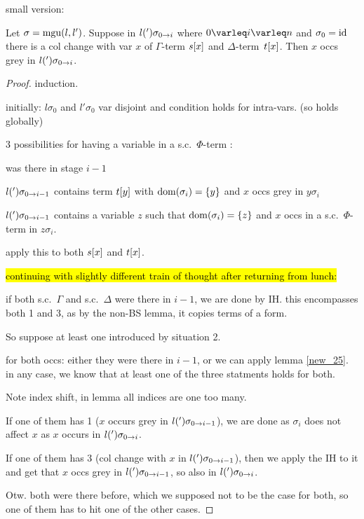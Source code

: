 \documentclass[,%
	paper=a4,%
	DIV11, %
	twoside=false,%
	liststotoc,
	bibtotoc,
	draft=false,%
	numbers=noendperiod
]{scrartcl}
\begin{document}
{\tiny

	small version: 

\begin{lemma}
	Let $\sigma = \operatorname{mgu}(l, l')$.
	Suppose in $l(')\sigma_{0 \rightarrow i}$ where $0\varleq i \varleq n$ and $\sigma_0 = \operatorname{id}$ there is a col change with var $x$ of $\Gamma$-term $s[x]$ and $\Delta$-term~$t[x]$.
	Then $x$ occs grey in $l(')\sigma_{0 \rightarrow i}$.
\end{lemma}
\begin{proof}
	induction.

	initially: $l\sigma_0$ and $l'\sigma_0$ var disjoint and condition holds for intra-vars. (so holds globally)

	3 possibilities for having a variable in a s.c.\ $\Phi$-term :
	\begin{compactenum}
	\item was there in stage $i-1$
	\item $l(')\sigma_{0 \rightarrow i-1}$ contains term $t[y]$ with $\operatorname{dom}(\sigma_i) = \{y\}$ and $x$ occs grey in $y\sigma_i$
	\item $l(')\sigma_{0 \rightarrow i-1}$ contains a variable $z$ such that $\operatorname{dom}(\sigma_i) = \{z\}$ and $x$ occs in a s.c.\ $\Phi$-term in $z\sigma_i$.
	\end{compactenum}

	apply this to both $s[x]$ and $t[x]$.

	\hl{continuing with slightly different train of thought after returning from lunch:}

	if both s.c.\ $\Gamma$ and s.c.\ $\Delta$ were there in $i-1$, we are done by IH. this encompasses both 1 and 3, as by the non-BS lemma, it copies terms of a form.

	So suppose at least one introduced by situation 2.

	for both occs: either they were there in $i-1$, or we can apply lemma \ref{new_25}. in any case, we know that at least one of the three statments holds for both.

	Note index shift, in lemma all indices are one too many.

	If one of them has 1 ($x$ occurs grey in $l(')\sigma_{0 \rightarrow i-1}$), we are done as $\sigma_i$ does not affect $x$ as $x$ occurs in $l(')\sigma_{0 \rightarrow i}$.

	If one of them has 3 (col change with $x$ in $l(')\sigma_{0 \rightarrow i-1}$), then we apply the IH to it and get that $x$ occs grey in $l(')\sigma_{0 \rightarrow i-1}$, so also in $l(')\sigma_{0 \rightarrow i}$.

	Otw. both were there before, which we supposed not to be the case for both, so one of them has to hit one of the other cases. 
\end{proof}

}
\end{document}
